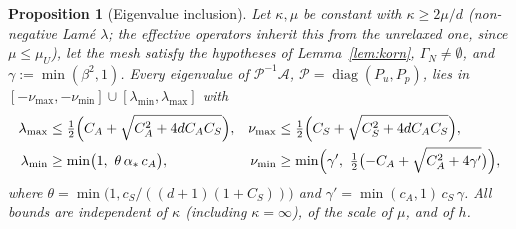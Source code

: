 \documentclass[11pt]{article}
\numberwithin{equation}{section}
\newtheorem{proposition}{Proposition}[section]
\theoremstyle{remark}
\begin{document}
\begin{proposition}[Eigenvalue inclusion]
\label{prop:spectrum}
Let $\kappa,\mu$ be constant with $\kappa\ge2\mu/d$ (non-negative Lamé
$\lambda$; the effective operators inherit this from the unrelaxed one,
since $\mu\le\mu_U$), let the mesh satisfy the hypotheses of
Lemma~\ref{lem:korn}, $\Gamma_N\ne\emptyset$, and $\gamma :=
\min(\beta^2,1)$. Every eigenvalue of $\mathcal P^{-1}\mathcal A$, $\mathcal
P = \operatorname{diag}(P_u,P_p)$, lies in $[-\nu_{\max},-\nu_{\min}]\cup
[\lambda_{\min},\lambda_{\max}]$ with
\begin{align}
  \lambda_{\max} &\le \tfrac12\Bigl(C_A + \sqrt{C_A^2 + 4dC_AC_S}\Bigr),
  &
  \nu_{\max} &\le \tfrac12\Bigl(C_S + \sqrt{C_S^2 + 4dC_AC_S}\Bigr),
  \label{eq:upper}\\
  \lambda_{\min} &\ge \min\bigl(1,\ \theta\,\alpha_*\,c_A\bigr),
  &
  \nu_{\min} &\ge \min\Bigl(\gamma',\ \tfrac12\bigl(-C_A +
  \sqrt{C_A^2 + 4\gamma'}\bigr)\Bigr),
  \label{eq:lower}
\end{align}
where $\theta = \min\bigl(1, c_S/((d+1)(1 + C_S))\bigr)$ and $\gamma' =
\min(c_A,1)\,c_S\,\gamma$. All bounds are independent of $\kappa$ (including
$\kappa = \infty$), of the scale of $\mu$, and of $h$.
\end{proposition}
\end{document}
